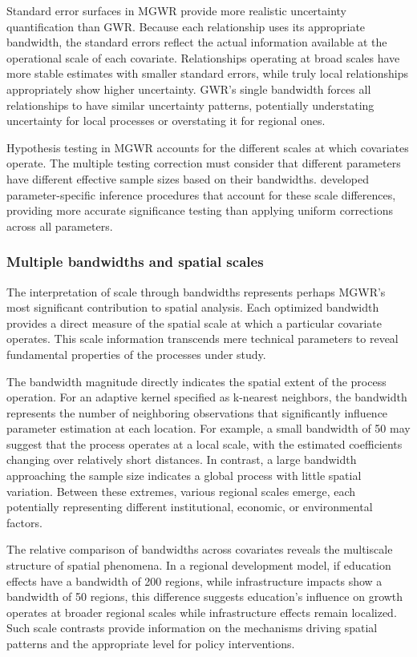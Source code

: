 \documentclass[smallextended, natbib]{svjour3}       %
\begin{document}
Standard error surfaces in MGWR provide more realistic uncertainty quantification than GWR. 
Because each relationship uses its appropriate bandwidth, the standard errors reflect the actual information available at the operational scale of each covariate.
Relationships operating at broad scales have more stable estimates with smaller standard errors, while truly local relationships appropriately show higher uncertainty. 
GWR's single bandwidth forces all relationships to have similar uncertainty patterns, potentially understating uncertainty for local processes or overstating it for regional ones.


Hypothesis testing in MGWR accounts for the different scales at which covariates operate.
The multiple testing correction must consider that different parameters have different effective sample sizes based on their bandwidths.
\cite{Yuetal2020} developed parameter-specific inference procedures that account for these scale differences, providing more accurate significance testing than applying uniform corrections across all parameters.

\subsubsection*{Multiple bandwidths and spatial scales}

The interpretation of scale through bandwidths represents perhaps MGWR's most significant contribution to spatial analysis. 
Each optimized bandwidth provides a direct measure of the spatial scale at which a particular covariate operates.
This scale information transcends mere technical parameters to reveal fundamental properties of the processes under study.

The bandwidth magnitude directly indicates the spatial extent of the process operation. 
For an adaptive kernel specified as k-nearest neighbors, the bandwidth represents the number of neighboring observations that significantly influence parameter estimation at each location. 
For example, a small bandwidth of 50 may suggest that the process operates at a local scale, with the estimated coefficients changing over relatively short distances. 
In contrast, a large bandwidth approaching the sample size indicates a global process with little spatial variation. 
Between these extremes, various regional scales emerge, each potentially representing different institutional, economic, or environmental factors.

The relative comparison of bandwidths across covariates reveals the multiscale structure of spatial phenomena. 
In a regional development model, if education effects have a bandwidth of 200 regions, while infrastructure impacts show a bandwidth of 50 regions, this difference suggests education's influence on growth operates at broader regional scales while infrastructure effects remain localized. 
Such scale contrasts provide information on the mechanisms driving spatial patterns and the appropriate level for policy interventions.
\end{document}
